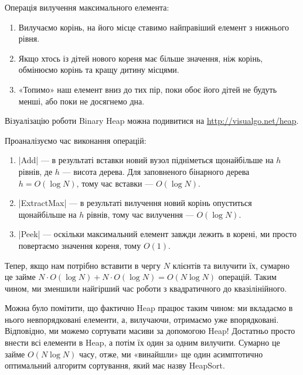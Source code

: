 \documentclass[12pt,a4paper]{report}
\begin{document}
Операція вилучення максимального елемента:
\begin{enumerate}
    \item Вилучаємо корінь, на його місце ставимо найправіший елемент з нижнього рівня.
    \item Якщо хтось із дітей нового кореня має більше значення, ніж корінь, обмінюємо корінь та кращу дитину місцями.
    \item «Топимо» наш елемент вниз до тих пір, поки обоє його дітей не будуть менші, або поки не досягнемо дна.
\end{enumerate}

Візуалізацію роботи Binary Heap можна подивитися на \href{http://visualgo.net/heap}{http://visualgo.net/heap}.

Проаналізуємо час виконання операцій:

\begin{enumerate}
    \item |Add| --- в результаті вставки новий вузол підніметься щонайбільше на \(h\) рівнів, де \(h\) --- висота дерева. Для заповненого бінарного дерева \(h = O(\log N)\), тому час вставки --- \(O(\log N)\).
    \item |ExtractMax| --- в результаті вилучення новий корінь опуститься щонайбільше на \(h\) рівнів, тому час вилучення --- \(O(\log N)\).
    \item |Peek| --- оскільки максимальний елемент завжди лежить в корені, ми просто повертаємо значення кореня, тому \(O(1)\).
\end{enumerate}

Тепер, якщо нам потрібно вставити в чергу \(N\) клієнтів та вилучити їх, сумарно це займе \(N \cdot O(\log N) + N \cdot O(\log N) = O(N \log N)\) операцій. Таким чином, ми зменшили найгірший час роботи з квадратичного до квазілінійного.

Можна було помітити, що фактично Heap працює таким чином: ми вкладаємо в нього невпорядковані елементи, а, вилучаючи, отримаємо уже впорядковані. Відповідно, ми можемо сортувати масиви за допомогою Heap! Достатньо просто внести всі елементи в Heap, а потім їх один за одним вилучити. Сумарно це займе \(O(N \log N)\) часу, отже, ми «винайшли» ще один асимптотично оптимальний алгоритм сортування, який має назву HeapSort.
\end{document}
